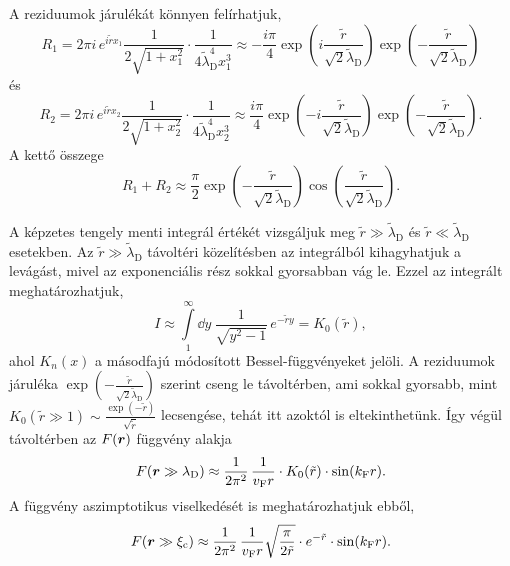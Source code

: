 \documentclass[a4paper,12pt,titlepage]{article}
\newcommand{\RR}{{\vb*{r}}}
\newcommand{\kF}{{k_\text{F}}}
\newcommand{\vF}{{v_\text{F}}}
\newcommand{\xic}{{\xi_\text{c}}}
\begin{document}
A reziduumok járulékát könnyen felírhatjuk,
\begin{equation}
	R_1 = 2 \pi i \, e^{i \tilde{r} x_1} \frac{1}{2 \sqrt{1 + x_1^2}} \cdot \frac{1}{4 \tilde{\lambda}_\text{D}^4 x_1^3} \approx -\frac{i \pi}{4} \exp(i \frac{\tilde{r}}{\sqrt{2} \tilde{\lambda}_\text{D}}) \exp(-\frac{\tilde{r}}{\sqrt{2} \tilde{\lambda}_\text{D}})
\end{equation}
és
\begin{equation}
	R_2 = 2 \pi i \, e^{i \tilde{r} x_2} \frac{1}{2 \sqrt{1 + x_2^2}} \cdot \frac{1}{4 \tilde{\lambda}_\text{D}^4 x_2^3} \approx \frac{i \pi}{4} \exp(-i \frac{\tilde{r}}{\sqrt{2} \tilde{\lambda}_\text{D}}) \exp(-\frac{\tilde{r}}{\sqrt{2} \tilde{\lambda}_\text{D}}).
\end{equation}
A kettő összege
\begin{equation}
	R_1 + R_2 \approx \frac{\pi}{2} \exp(-\frac{\tilde{r}}{\sqrt{2} \tilde{\lambda}_\text{D}}) \cos(\frac{\tilde{r}}{\sqrt{2} \tilde{\lambda}_\text{D}}).
\end{equation}

A képzetes tengely menti integrál értékét vizsgáljuk meg $\tilde{r} \gg \tilde{\lambda}_\text{D}$ és $\tilde{r} \ll \tilde{\lambda}_\text{D}$ esetekben.  Az $\tilde{r} \gg \tilde{\lambda}_\text{D}$ távoltéri közelítésben az integrálból kihagyhatjuk a levágást, mivel az exponenciális rész sokkal gyorsabban vág le.  Ezzel az integrált meghatározhatjuk,
\begin{equation}
	I \approx \int\limits_1^\infty \dd{y} ~ \frac{1}{\sqrt{y^2 - 1}} \, e^{-\tilde{r} y} = K_0(\tilde{r}),
\end{equation}
ahol $K_n(x)$ a másodfajú módosított Bessel-függvényeket jelöli.  A reziduumok járuléka $\exp(-\frac{\tilde{r}}{\sqrt{2} \tilde{\lambda}_\text{D}})$ szerint cseng le távoltérben, ami sokkal gyorsabb, mint $K_0(\tilde{r} \gg 1) \sim \frac{\exp(-\tilde{r})}{\sqrt{\tilde{r}}}$ lecsengése, tehát itt azoktól is eltekinthetünk.  Így végül távoltérben az $F(\RR)$ függvény alakja
\begin{equation}
	F(\RR \gg \lambda_\text{D}) \approx \frac{1}{2 \pi^2} \, \frac{1}{\vF r} \cdot K_0(\tilde{r}) \cdot \sin(\kF r).
\end{equation}
A függvény aszimptotikus viselkedését is meghatározhatjuk ebből,
\begin{equation}
	F(\RR \gg \xic) \approx \frac{1}{2 \pi^2} \, \frac{1}{\vF r} \sqrt{\frac{\pi}{2 \tilde{r}}} \cdot e^{-\tilde{r}} \cdot \sin(\kF r).
\end{equation}
\end{document}
